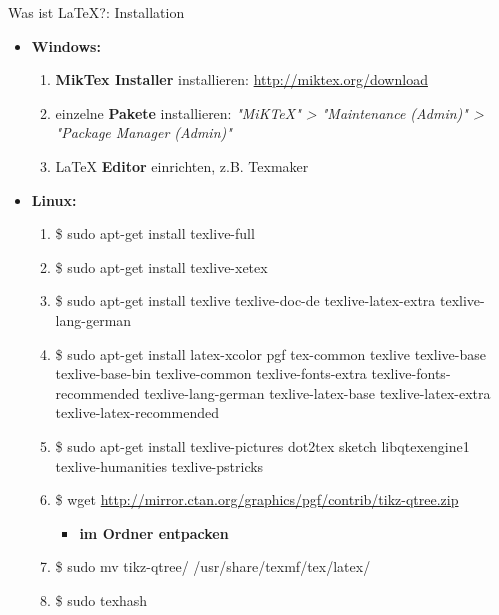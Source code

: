 \begin{frame}{Was ist \LaTeX?: Installation}
\begin{itemize}
\item \textbf{Windows:}
\begin{enumerate}
\item \textbf{MikTex Installer} installieren: \url{http://miktex.org/download}
\item einzelne \textbf{Pakete} installieren: \textit{"MiKTeX" > "Maintenance (Admin)" > "Package Manager (Admin)"}
\item \LaTeX{} \textbf{Editor} einrichten, z.B. Texmaker
\end{enumerate}
\item \textbf{Linux:}
\begin{enumerate}
\item \$ sudo apt-get install texlive-full
\item \$ sudo apt-get install texlive-xetex
\item \$ sudo apt-get install texlive texlive-doc-de texlive-latex-extra texlive-lang-german
\item \$ sudo apt-get install latex-xcolor pgf tex-common texlive texlive-base texlive-base-bin texlive-common texlive-fonts-extra texlive-fonts-recommended texlive-lang-german texlive-latex-base texlive-latex-extra texlive-latex-recommended
\item \$ sudo apt-get install texlive-pictures dot2tex sketch libqtexengine1 texlive-humanities texlive-pstricks
\item \$ wget \url{http://mirror.ctan.org/graphics/pgf/contrib/tikz-qtree.zip}
\begin{itemize}
\item \textbf{im Ordner entpacken}
\end{itemize}

\item \$ sudo mv tikz-qtree/ /usr/share/texmf/tex/latex/
\item \$ sudo texhash
\end{enumerate}
\end{itemize}
\end{frame}
